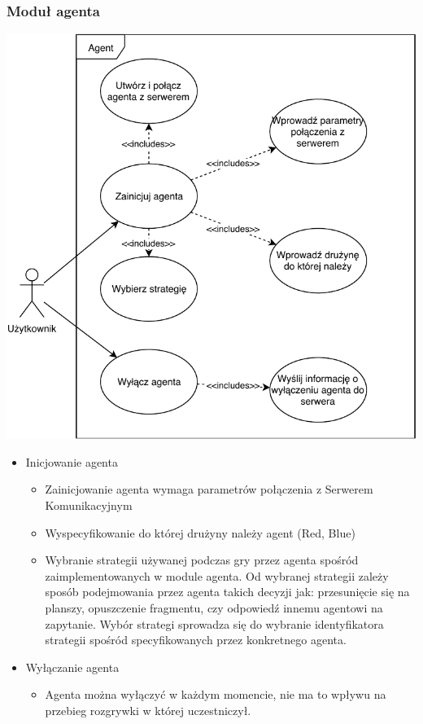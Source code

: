 \documentclass[../Dokumentacja.tex]{subfiles}
\begin{document}
\subsubsection{Moduł agenta}
\includegraphics[width=\textwidth]{resources/USER-AGENT.pdf}
\begin{itemize}
	\item Inicjowanie agenta
	\begin{itemize}
		\item Zainicjowanie agenta wymaga parametrów połączenia z Serwerem Komunikacyjnym
		\item Wyspecyfikowanie do której drużyny należy agent (Red, Blue)
		\item Wybranie strategii używanej podczas gry przez agenta spośród zaimplementowanych w module agenta. Od wybranej strategii zależy sposób podejmowania przez agenta takich decyzji jak: przesunięcie się na planszy, opuszczenie fragmentu, czy odpowiedź innemu agentowi na zapytanie. Wybór strategi sprowadza się do wybranie identyfikatora strategii spośród specyfikowanych przez konkretnego agenta.
	\end{itemize}
	\item Wyłączanie agenta
	\begin{itemize}
		\item Agenta można wyłączyć w każdym momencie, nie ma to wpływu na przebieg rozgrywki w której uczestniczył.
	\end{itemize}
\end{itemize}
\end{document}
